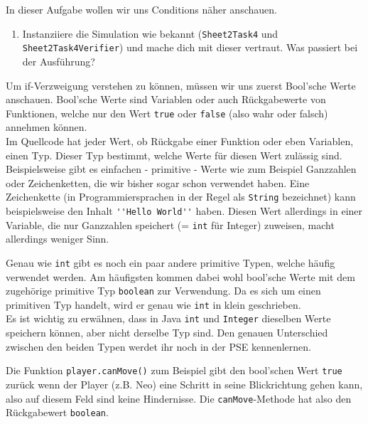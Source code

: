 

In dieser Aufgabe wollen wir uns Conditions näher anschauen.

\begin{enumerate}                           
    \item Instanziiere die Simulation wie bekannt (\lstinline{Sheet2Task4} und \lstinline{Sheet2Task4Verifier}) und mache dich mit dieser vertraut.
        Was passiert bei der Ausführung?
\end{enumerate}

\begin{Infobox}
    Um if-Verzweigung verstehen zu können, müssen wir uns zuerst Bool'sche Werte anschauen. Bool'sche Werte sind Variablen oder auch Rückgabewerte von Funktionen, welche nur den Wert \lstinline{true} oder \lstinline{false} (also wahr oder falsch) annehmen können. \\
    Im Quellcode hat jeder Wert, ob Rückgabe einer Funktion oder eben Variablen, einen Typ.
    Dieser Typ bestimmt, welche Werte für diesen Wert zulässig sind.
    Beispielsweise gibt es einfachen - primitive - Werte wie zum Beispiel Ganzzahlen oder Zeichenketten, die wir bisher sogar schon verwendet haben.
    Eine Zeichenkette (in Programmiersprachen in der Regel als \lstinline{String} bezeichnet) kann beispielsweise den Inhalt \lstinline{''Hello World''} haben.
    Diesen Wert allerdings in einer Variable, die nur Ganzzahlen speichert (= \lstinline{int} für Integer) zuweisen, macht allerdings weniger Sinn.
    
    Genau wie \lstinline{int} gibt es noch ein paar andere primitive Typen, welche häufig verwendet werden.
    Am häufigsten kommen dabei wohl bool'sche Werte mit dem zugehörige primitive Typ \lstinline{boolean} zur Verwendung.
    Da es sich um einen primitiven Typ handelt, wird er genau wie \lstinline{int} in klein geschrieben.\\
    
    Es ist wichtig zu erwähnen, dass in Java \lstinline{int} und \lstinline{Integer} dieselben Werte speichern können, aber nicht derselbe Typ sind.
    Den genauen Unterschied zwischen den beiden Typen werdet ihr noch in der PSE kennenlernen.
    
    Die Funktion \lstinline{player.canMove()} zum Beispiel gibt den bool'schen Wert \lstinline{true} zurück wenn der Player (z.B. Neo) eine Schritt in seine Blickrichtung gehen kann, also auf diesem Feld sind keine Hindernisse.
    Die \lstinline{canMove}-Methode hat also den Rückgabewert \lstinline{boolean}.
    
\end{Infobox}

